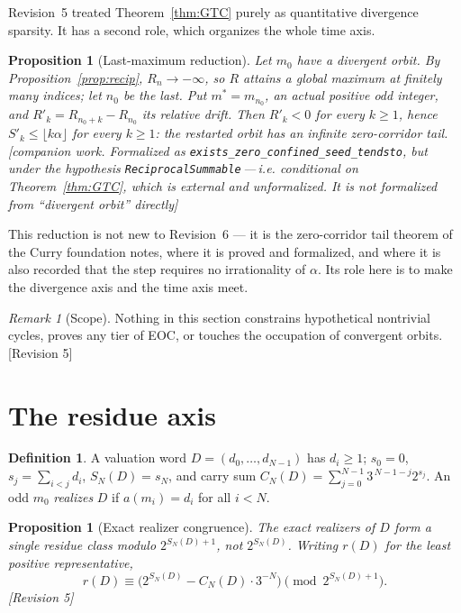 \documentclass[11pt]{article}
\theoremstyle{plain}
\newtheorem{proposition}[theorem]{Proposition}
\theoremstyle{definition}
\newtheorem{definition}[theorem]{Definition}
\theoremstyle{remark}
\newtheorem{remark}[theorem]{Remark}
\newcommand{\al}{\alpha}
\newcommand{\status}[1]{\textsf{\footnotesize[#1]}}
\begin{document}
Revision~5 treated Theorem~\ref{thm:GTC} purely as quantitative divergence sparsity. It has a
second role, which organizes the whole time axis.

\begin{proposition}[Last-maximum reduction]\label{prop:lastmax}
Let $m_0$ have a divergent orbit. By Proposition~\ref{prop:recip}, $R_n\to-\infty$, so $R$ attains
a global maximum at finitely many indices; let $n_0$ be the \emph{last}. Put $m^*=m_{n_0}$, an
actual positive odd integer, and $R'_k=R_{n_0+k}-R_{n_0}$ its relative drift. Then $R'_k<0$ for
every $k\ge1$, hence $S'_k\le\lfloor k\al\rfloor$ for every $k\ge1$: the restarted orbit has an
infinite zero-corridor tail. \status{companion work. Formalized as
\texttt{exists\_zero\_confined\_seed\_tendsto}, but under the hypothesis
\texttt{ReciprocalSummable}\,---\,i.e. conditional on Theorem~\ref{thm:GTC}, which is external and
unformalized. It is \emph{not} formalized from ``divergent orbit'' directly}
\end{proposition}

This reduction is not new to Revision~6 --- it is the zero-corridor tail theorem of the Curry
foundation notes, where it is proved and formalized, and where it is also recorded that the step
requires no irrationality of $\al$. Its role here is to make the divergence axis and the time axis
meet.

\begin{remark}[Scope]
Nothing in this section constrains hypothetical nontrivial cycles, proves any tier of EOC, or
touches the occupation of convergent orbits. \status{Revision 5}
\end{remark}

\section{The residue axis}\label{sec:residue}

\begin{definition}
A valuation word $D=(d_0,\dots,d_{N-1})$ has $d_i\ge1$; $s_0=0$, $s_j=\sum_{i<j}d_i$,
$S_N(D)=s_N$, and carry sum $C_N(D)=\sum_{j=0}^{N-1}3^{\,N-1-j}2^{s_j}$. An odd $m_0$
\emph{realizes} $D$ if $a(m_i)=d_i$ for all $i<N$.
\end{definition}

\begin{proposition}[Exact realizer congruence]\label{prop:congruence}
The exact realizers of $D$ form a single residue class modulo $2^{S_N(D)+1}$, not $2^{S_N(D)}$.
Writing $r(D)$ for the least positive representative,
\[
r(D)\equiv\bigl(2^{S_N(D)}-C_N(D)\cdot3^{-N}\bigr)\pmod{2^{S_N(D)+1}} .
\]
\status{Revision 5}
\end{proposition}
\end{document}
